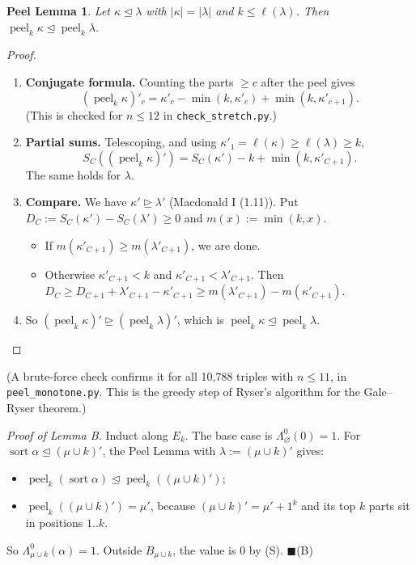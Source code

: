 \documentclass[11pt]{article}
\newtheorem*{peel}{Peel Lemma}
\theoremstyle{definition}
\newcommand{\dom}{\trianglerighteq}
\newcommand{\domd}{\trianglelefteq}
\newcommand{\sort}{\operatorname{sort}}
\newcommand{\peelk}{\operatorname{peel}_k}
\newcommand{\file}[1]{\texttt{#1}}
\begin{document}
\begin{peel}
Let $\kappa \domd \lambda$ with $|\kappa| = |\lambda|$ and $k \le \ell(\lambda)$. Then $\peelk\kappa \domd \peelk\lambda$.
\end{peel}

\begin{proof}
\leavevmode
\begin{enumerate}
\item \textbf{Conjugate formula.} Counting the parts $\ge c$ after the peel gives
\[
(\peelk\kappa)'_c = \kappa'_c - \min(k, \kappa'_c) + \min(k, \kappa'_{c+1}).
\]
(This is checked for $n \le 12$ in \file{check\_stretch.py}.)
\item \textbf{Partial sums.} Telescoping, and using $\kappa'_1 = \ell(\kappa) \ge \ell(\lambda) \ge k$,
\[
S_C((\peelk\kappa)') = S_C(\kappa') - k + \min(k, \kappa'_{C+1}).
\]
The same holds for $\lambda$.
\item \textbf{Compare.} We have $\kappa' \dom \lambda'$ (Macdonald I (1.11)). Put $D_C := S_C(\kappa') - S_C(\lambda') \ge 0$ and $m(x) := \min(k, x)$.
 \begin{itemize}
 \item If $m(\kappa'_{C+1}) \ge m(\lambda'_{C+1})$, we are done.
 \item Otherwise $\kappa'_{C+1} < k$ and $\kappa'_{C+1} < \lambda'_{C+1}$. Then $D_C \ge D_{C+1} + \lambda'_{C+1} - \kappa'_{C+1} \ge m(\lambda'_{C+1}) - m(\kappa'_{C+1})$.
 \end{itemize}
\item So $(\peelk\kappa)' \dom (\peelk\lambda)'$, which is $\peelk\kappa \domd \peelk\lambda$. \qedhere
\end{enumerate}
\end{proof}

\noindent(A brute-force check confirms it for all 10,788 triples with $n \le 11$, in \file{peel\_monotone.py}. This is the greedy step of Ryser's algorithm for the Gale--Ryser theorem.)

\medskip
\noindent\emph{Proof of Lemma B.} Induct along $E_k$. The base case is $\Lambda^0_\varnothing(0) = 1$. For $\sort\alpha \domd (\mu\cup k)'$, the Peel Lemma with $\lambda := (\mu\cup k)'$ gives:
\begin{itemize}
\item $\peelk(\sort\alpha) \domd \peelk((\mu\cup k)')$;
\item $\peelk((\mu\cup k)') = \mu'$, because $(\mu\cup k)' = \mu' + 1^k$ and its top $k$ parts sit in positions $1..k$.
\end{itemize}
So $\Lambda^0_{\mu\cup k}(\alpha) = 1$. Outside $B_{\mu\cup k}$, the value is $0$ by (S). \hfill$\blacksquare$(B)
\end{document}

